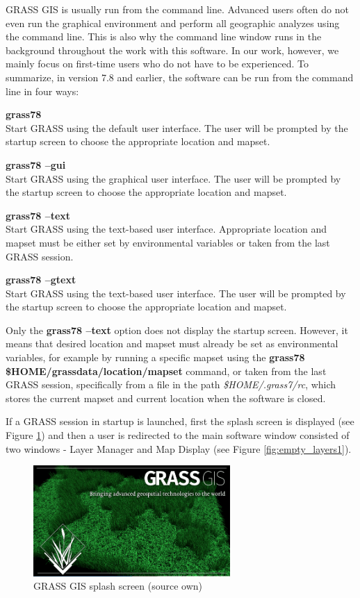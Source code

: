 \documentclass[a4paper,10pt,twoside]{article}
\begin{document}
\noindent GRASS GIS is usually run from the command line. Advanced users often do not even run the graphical environment and perform all geographic analyzes using the command line. This is also why the command line window runs in the background throughout the work with this software. In our work, however, we mainly focus on first-time users who do not have to be experienced. To summarize, in version 7.8 and earlier, the software can be run from the command line in four ways:

\noindent \textbf{grass78} \\
\noindent Start GRASS using the default user interface. The user will be prompted by the startup screen to choose the appropriate location and mapset.

\noindent \textbf{grass78 --gui}\\
\noindent Start GRASS using the graphical user interface. The user will be prompted by the startup screen to choose the appropriate location and mapset.

\noindent \textbf{grass78 --text} \\
\noindent Start GRASS using the text-based user interface. Appropriate location and mapset must be either set by environmental variables or taken from the last GRASS session.

\noindent \textbf{grass78 --gtext} \\
\noindent Start GRASS using the text-based user interface. The user will be prompted by the startup screen to choose the appropriate location and mapset.

Only the \textbf{grass78 --text} option does not display the startup screen. However, it means that desired location and mapset must already be set as environmental variables, for example by running a specific mapset using the \textbf{grass78 \$HOME/grassdata/location/mapset} command, or taken from the last GRASS session, specifically from a file in the path \textit{\$HOME/.grass7/rc}, which stores the current mapset and current location when the software is closed.

If a GRASS session in startup is launched, first the splash screen is displayed (see Figure \ref{fig:splash_screen}) and then a user is redirected to the main software window consisted of two windows - Layer Manager and Map Display (see Figure \ref{fig:empty_layers1}). 

\vspace{0.3cm}
\begin{figure}[hbt!] 
\begin{center}
\includegraphics[width=7.5cm]{pictures/splash_screen.png} 
\caption[GRASS GIS splash screen]{GRASS GIS splash screen (source own)}
\label{fig:splash_screen}
\end{center}
\end{figure}
\end{document}
